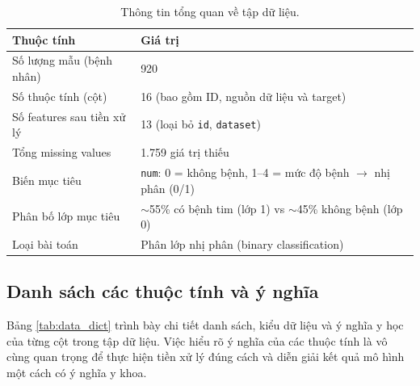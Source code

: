 \begin{table}[H]
\centering
\caption{Thông tin tổng quan về tập dữ liệu.}
\label{tab:data_overview}
\begin{tabular}{|l|l|}
\hline
\textbf{Thuộc tính} & \textbf{Giá trị} \\ \hline
Số lượng mẫu (bệnh nhân) & 920 \\ \hline
Số thuộc tính (cột) & 16 (bao gồm ID, nguồn dữ liệu và target) \\ \hline
Số features sau tiền xử lý & 13 (loại bỏ \texttt{id}, \texttt{dataset}) \\ \hline
Tổng missing values & 1.759 giá trị thiếu \\ \hline
Biến mục tiêu & \texttt{num}: 0 = không bệnh, 1--4 = mức độ bệnh $\rightarrow$ nhị phân (0/1) \\ \hline
Phân bố lớp mục tiêu & $\sim$55\% có bệnh tim (lớp 1) vs $\sim$45\% không bệnh (lớp 0) \\ \hline
Loại bài toán & Phân lớp nhị phân (binary classification) \\ \hline
\end{tabular}
\end{table}

\subsection{Danh sách các thuộc tính và ý nghĩa}

Bảng \ref{tab:data_dict} trình bày chi tiết danh sách, kiểu dữ liệu và ý nghĩa y học của từng cột trong tập dữ liệu. Việc hiểu rõ ý nghĩa của các thuộc tính là vô cùng quan trọng để thực hiện tiền xử lý đúng cách và diễn giải kết quả mô hình một cách có ý nghĩa y khoa.

